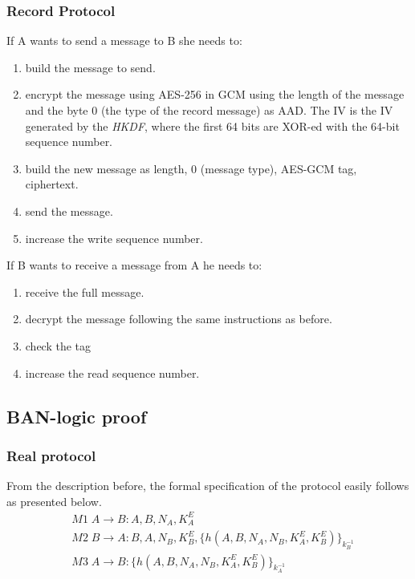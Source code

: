 \subsubsection{Record Protocol}
If A wants to send a message to B she needs to:
\begin{enumerate}
    \item build the message to send.
    \item encrypt the message using AES-256 in GCM using the length of the 
        message and the byte 0 (the type of the record message) as AAD. The IV
        is the IV generated by the \emph{HKDF}, where the first 64 bits are 
        XOR-ed with the 64-bit sequence number.
    \item build the new message as length, 0 (message type), AES-GCM tag, 
        ciphertext.
    \item send the message.
    \item increase the write sequence number.
\end{enumerate}

If B wants to receive a message from A he needs to:
\begin{enumerate}
    \item receive the full message.
    \item decrypt the message following the same instructions as before.
    \item check the tag
    \item increase the read sequence number.
\end{enumerate}

\subsection{BAN-logic proof}
\subsubsection{Real protocol}
From the description before, the formal specification of the protocol easily 
follows as presented below.
\begin{align*}
    &M1 \; A \rightarrow B : A, B, N_A, K_A^E \\
    &M2 \; B \rightarrow A : B, A, N_B, K_B^E, \{h(A,B,N_A,N_B,K_A^E,K_B^E)\}_{k_B^{-1}} \\
    &M3 \; A \rightarrow B : \{h(A,B,N_A,N_B,K_A^E,K_B^E)\}_{k_A^{-1}}
\end{align*}

